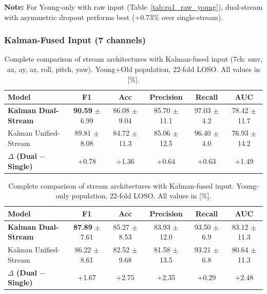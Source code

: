 \documentclass{article}
\begin{document}
\textbf{Note:} For Young-only with raw input (Table~\ref{tab:rq1_raw_young}), dual-stream with asymmetric dropout performs best (+0.73\% over single-stream).

\subsubsection{Kalman-Fused Input (7 channels)}

\begin{table}[htbp]
    \centering
    \caption{Complete comparison of stream architectures with Kalman-fused input (7ch: smv, ax, ay, az, roll, pitch, yaw). Young+Old population, 22-fold LOSO. All values in [\%].}
    \label{tab:rq1_kalman_yo}
    \begin{tabular}{lccccc}
        \toprule
        \textbf{Model} & \textbf{F1} & \textbf{Acc} & \textbf{Precision} & \textbf{Recall} & \textbf{AUC} \\
        \midrule
        \textbf{Kalman Dual-Stream} & \textbf{90.59} $\pm$ 6.99 & 86.08 $\pm$ 9.04 & 85.70 $\pm$ 11.1 & 97.03 $\pm$ 4.2 & 78.42 $\pm$ 11.7 \\
        Kalman Unified-Stream & 89.81 $\pm$ 8.08 & 84.72 $\pm$ 11.3 & 85.06 $\pm$ 12.5 & 96.40 $\pm$ 4.0 & 76.93 $\pm$ 14.2 \\
        \midrule
        \textbf{$\Delta$ (Dual $-$ Single)} & +0.78 & +1.36 & +0.64 & +0.63 & +1.49 \\
        \bottomrule
    \end{tabular}
\end{table}

\begin{table}[htbp]
    \centering
    \caption{Complete comparison of stream architectures with Kalman-fused input. Young-only population, 22-fold LOSO. All values in [\%].}
    \label{tab:rq1_kalman_young}
    \begin{tabular}{lccccc}
        \toprule
        \textbf{Model} & \textbf{F1} & \textbf{Acc} & \textbf{Precision} & \textbf{Recall} & \textbf{AUC} \\
        \midrule
        \textbf{Kalman Dual-Stream} & \textbf{87.89} $\pm$ 7.61 & 85.27 $\pm$ 8.53 & 83.93 $\pm$ 12.0 & 93.50 $\pm$ 6.9 & 83.12 $\pm$ 11.3 \\
        Kalman Unified-Stream & 86.22 $\pm$ 8.61 & 82.52 $\pm$ 9.68 & 81.58 $\pm$ 13.5 & 93.21 $\pm$ 6.8 & 80.64 $\pm$ 11.3 \\
        \midrule
        \textbf{$\Delta$ (Dual $-$ Single)} & +1.67 & +2.75 & +2.35 & +0.29 & +2.48 \\
        \bottomrule
    \end{tabular}
\end{table}
\end{document}
